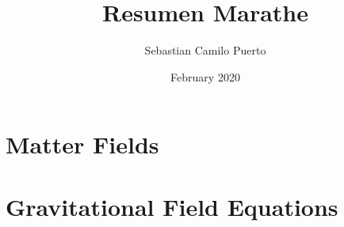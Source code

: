 \documentclass[12pt]{report}
\title{Resumen Marathe}
\date{February 2020}
\author{Sebastian Camilo Puerto}
\begin{document}
\maketitle

\tableofcontents












\section{Matter Fields}

\section{Gravitational Field Equations}
\end{document}
